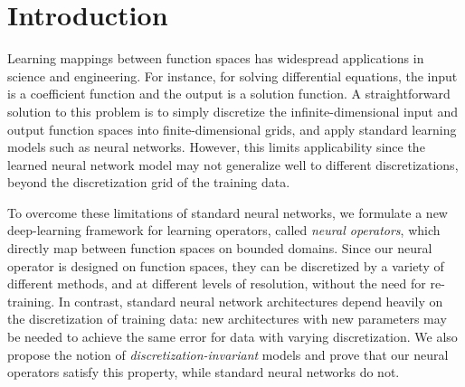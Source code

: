 


\section{Introduction}
\label{sec:I}


Learning mappings between  function spaces has widespread applications  in science and engineering. For instance, for  solving differential equations,  the input is a coefficient function and the output is a solution function. A straightforward solution to this problem  is to simply  discretize the infinite-dimensional input and output function spaces into finite-dimensional grids, and apply standard learning models such as 
neural networks. However, this limits  applicability since the learned  neural network model may not  generalize well to different discretizations, beyond the discretization grid of the training data.

To overcome these limitations of standard neural networks, we  formulate a new deep-learning framework for learning operators, called {\em neural operators}, which directly map between  function spaces on bounded domains.  Since our neural operator is  designed on function spaces, they
can be discretized by a variety of different methods, and at different levels of resolution, without the need for re-training. In contrast, standard neural network architectures depend heavily on the discretization of training data: new architectures with new parameters may be needed to achieve the same error for   data with varying discretization.  We also propose the notion of {\em discretization-invariant} models and prove that our neural operators satisfy this property, while standard neural networks do not. 


